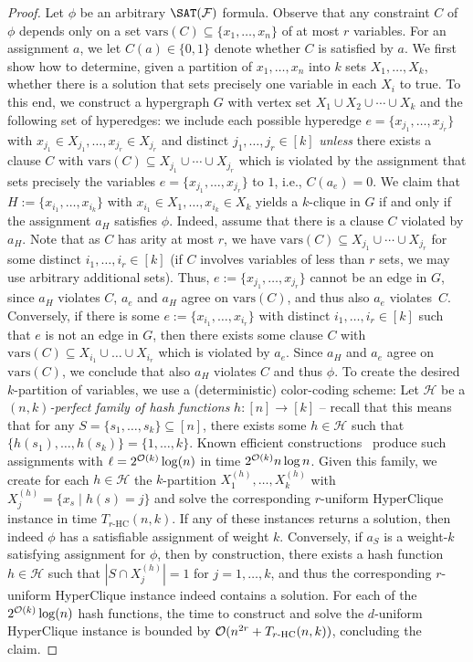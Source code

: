 \documentclass[10pt,a4paper]{article}
\theoremstyle{plain}
\newcommand{\Oh}{{\cal O}}
\newcommand{\confam}{\mathcal{F}}
\newcommand{\THC}[1]{T_{#1\text{-HC}}}
\newcommand{\vars}{\mathrm{vars}}
\begin{document}
\begin{proof}
Let $\phi$ be an arbitrary $\SAT(\confam)$ formula. Observe that any constraint $C$ of $\phi$ depends only on a set $\vars(C)\subseteq \{x_1,\dots,x_n\}$ of at most $r$ variables. For an assignment $a$, we let $C(a)\in \{0,1\}$ denote whether $C$ is satisfied by $a$.
%
We first show how to determine, given a partition of $x_1, \dots, x_n$ into $k$ sets $X_1,\dots, X_k$, whether there is a solution that sets precisely one variable in each $X_i$ to true. To this end, we construct a hypergraph $G$ with vertex set $X_1 \cup X_2 \cup \cdots \cup X_k$ and the following set of hyperedges: we include each possible hyperedge $e=\{x_{j_1}, \dots, x_{j_r}\}$ with $x_{j_1}\in X_{j_1}, \dots, x_{j_r} \in X_{j_r}$ and distinct $j_1, \dots, j_r\in [k]$ \emph{unless} there exists a clause $C$ with $\vars(C) \subseteq X_{j_1} \cup \cdots \cup X_{j_r}$ which is violated by the assignment that sets precisely the variables $e=\{x_{j_1}, \dots, x_{j_r}\}$ to $1$, i.e., $C(a_{e}) = 0$.
%
We claim that $H := \{x_{i_1}, \dots, x_{i_{k}}\}$ with  $x_{i_1} \in X_1, \dots, x_{i_k} \in X_k$ yields a $k$-clique in $G$ if and only if the assignment $a_{H}$ satisfies $\phi$. Indeed, assume that there is a clause $C$ violated by $a_{H}$. Note that as $C$ has arity at most $r$, we have $\vars(C) \subseteq X_{j_1} \cup \cdots \cup X_{j_r}$ for some distinct $i_1, \dots, i_r \in [k]$ (if $C$ involves variables of less than $r$ sets, we may use arbitrary additional sets). Thus, $e:=\{x_{j_1}, \dots, x_{j_r}\}$ cannot be an edge in $G$, since $a_H$ violates $C$, $a_e$ and $a_H$ agree on $\vars(C)$, and thus also $a_{e}$ violates~$C$. Conversely, if there is some $e:= \{x_{i_1}, \dots, x_{i_r}\}$ with distinct $i_1, \dots, i_r \in [k]$ such that $e$ is not an edge in $G$, then there exists some clause $C$ with $\vars(C) \subseteq X_{i_1} \cup \dots \cup X_{i_r}$ which is violated by $a_e$. Since $a_H$ and $a_e$ agree on $\vars(C)$, we conclude that also $a_H$ violates $C$ and thus $\phi$.
%
To create the desired $k$-partition of variables, we use a (deterministic) color-coding scheme: Let $\mathcal{H}$ be a \emph{$(n,k)$-perfect family of hash functions} $h : [n]\to [k]$ -- recall that this means that for any $S=\{s_1,\dots, s_k\}\subseteq [n]$, there exists some $h\in \mathcal{H}$ such that $\{h(s_1),\dots, h(s_k)\} = \{1,\dots, k\}$. Known efficient constructions~\cite{SchmidtS90, AlonYZ95} produce such assignments with $\ell = 2^{\Oh(k)}\log(n)$ in time $2^{\Oh(k)}n \log n$. Given this family, we create for each $h \in \mathcal{H}$ the $k$-partition $X^{(h)}_1, \dots, X^{(h)}_k$ with $X^{(h)}_j = \{ x_{s} \mid h(s) = j\}$ and solve the corresponding $r$-uniform HyperClique instance in time $\THC{r}(n,k)$. If any of these instances returns a solution, then indeed $\phi$ has a satisfiable assignment of weight $k$. Conversely, if $a_S$ is a weight-$k$ satisfying assignment for $\phi$, then by construction, there exists a hash function $h \in \mathcal{H}$ such that $|S\cap X^{(h)}_j|=1$ for $j=1,\dots, k$, and thus the corresponding $r$-uniform HyperClique instance indeed contains a solution. For each of the $2^{\Oh(k)}\log(n)$ hash functions, the time to construct and solve the $d$-uniform HyperClique instance is bounded by $\Oh(n^{2r} + \THC{r}(n,k))$, concluding the claim. 

\end{proof}
\end{document}
